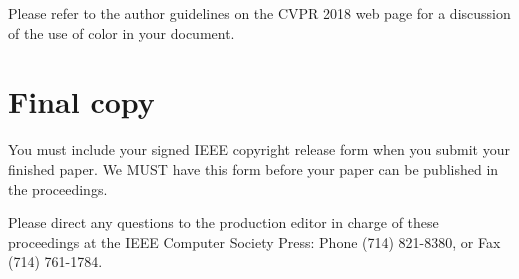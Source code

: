 \documentclass[10pt,twocolumn,letterpaper]{article}
\begin{document}
Please refer to the author guidelines on the CVPR 2018 web page for a discussion
of the use of color in your document.

\section{Final copy}

You must include your signed IEEE copyright release form when you submit
your finished paper. We MUST have this form before your paper can be
published in the proceedings.

Please direct any questions to the production editor in charge of these
proceedings at the IEEE Computer Society Press: Phone (714) 821-8380, or
Fax (714) 761-1784.

{\small


}
\end{document}
